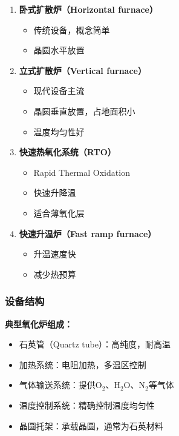 \documentclass[UTF8,12pt,a4paper]{ctexart}
\begin{document}
\begin{enumerate}
    \item \textbf{卧式扩散炉（Horizontal furnace）}
    \begin{itemize}
        \item 传统设备，概念简单
        \item 晶圆水平放置
    \end{itemize}
    
    \item \textbf{立式扩散炉（Vertical furnace）}
    \begin{itemize}
        \item 现代设备主流
        \item 晶圆垂直放置，占地面积小
        \item 温度均匀性好
    \end{itemize}
    
    \item \textbf{快速热氧化系统（RTO）}
    \begin{itemize}
        \item Rapid Thermal Oxidation
        \item 快速升降温
        \item 适合薄氧化层
    \end{itemize}
    
    \item \textbf{快速升温炉（Fast ramp furnace）}
    \begin{itemize}
        \item 升温速度快
        \item 减少热预算
    \end{itemize}
\end{enumerate}

\subsubsection{设备结构}

\textbf{典型氧化炉组成：}
\begin{itemize}
    \item 石英管（Quartz tube）：高纯度，耐高温
    \item 加热系统：电阻加热，多温区控制
    \item 气体输送系统：提供O$_2$、H$_2$O、N$_2$等气体
    \item 温度控制系统：精确控制温度均匀性
    \item 晶圆托架：承载晶圆，通常为石英材料
\end{itemize}
\end{document}
